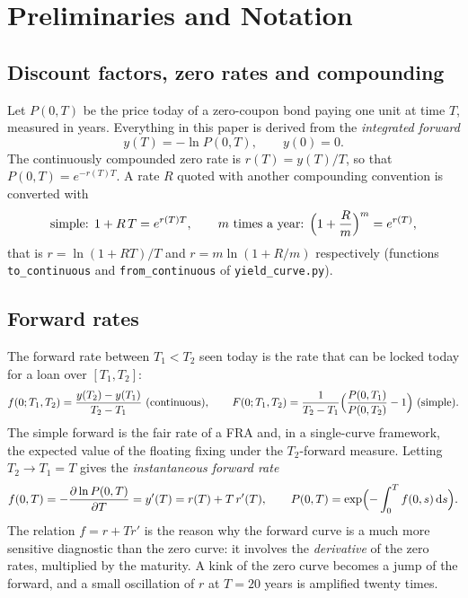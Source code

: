 \documentclass[11pt,a4paper]{article}
\theoremstyle{plain}
\theoremstyle{definition}
\newcommand{\dd}{\mathrm{d}}
\begin{document}
\clearpage
\section{Preliminaries and Notation}
\label{sec:prelim}

\subsection{Discount factors, zero rates and compounding}
Let $P(0,T)$ be the price today of a zero-coupon bond paying one unit at time $T$, measured in years. Everything in this paper is derived from the \emph{integrated forward}
\begin{equation}
    y(T) = -\ln P(0,T), \qquad y(0)=0.
    \label{eq:y}
\end{equation}
The continuously compounded zero rate is $r(T)=y(T)/T$, so that $P(0,T)=e^{-r(T)T}$. A rate $R$ quoted with another compounding convention is converted with
\begin{equation}
    \text{simple: } 1+R\,T=e^{r(T)T}, \qquad
    \text{$m$ times a year: } \Bigl(1+\frac{R}{m}\Bigr)^{m}=e^{r(T)},
    \label{eq:compounding}
\end{equation}
that is $r=\ln(1+RT)/T$ and $r=m\ln(1+R/m)$ respectively (functions \texttt{to\_continuous} and \texttt{from\_continuous} of \texttt{yield\_curve.py}).

\subsection{Forward rates}
The forward rate between $T_1<T_2$ seen today is the rate that can be locked today for a loan over $[T_1,T_2]$:
\begin{equation}
    f(0;T_1,T_2)=\frac{y(T_2)-y(T_1)}{T_2-T_1}\ \text{(continuous)}, \qquad
    F(0;T_1,T_2)=\frac{1}{T_2-T_1}\Bigl(\frac{P(0,T_1)}{P(0,T_2)}-1\Bigr)\ \text{(simple)}.
    \label{eq:fwd}
\end{equation}
The simple forward is the fair rate of a FRA and, in a single-curve framework, the expected value of the floating fixing under the $T_2$-forward measure. Letting $T_2\to T_1=T$ gives the \emph{instantaneous forward rate}
\begin{equation}
    f(0,T)=-\frac{\partial\ln P(0,T)}{\partial T}=y'(T)=r(T)+T\,r'(T),
    \qquad
    P(0,T)=\exp\Bigl(-\int_0^Tf(0,s)\,\dd s\Bigr).
    \label{eq:instfwd}
\end{equation}
The relation $f=r+Tr'$ is the reason why the forward curve is a much more sensitive diagnostic than the zero curve: it involves the \emph{derivative} of the zero rates, multiplied by the maturity. A kink of the zero curve becomes a jump of the forward, and a small oscillation of $r$ at $T=20$ years is amplified twenty times.
\end{document}
